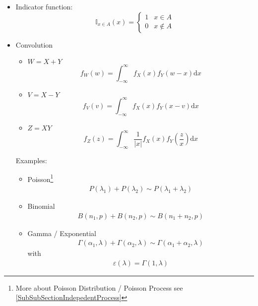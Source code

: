 \begin{itemize}
        
        \item Indicator function:
        \begin{equation}    
            \mathbb{I}_{x\in A}(x)=\begin{cases}
                1& x\in  A\\
                0& x\notin A
            \end{cases}
        \end{equation}
        \item Convolution
        \begin{itemize}
            \item $W=X+Y$
            \begin{equation}        
                f_W(w)=\int_{-\infty}^\infty f_X(x)f_Y(w-x)\mathrm{d}x    
            \end{equation}
            \item $V=X-Y$
            \begin{equation}        
                f_V(v)=\int_{-\infty}^\infty f_X(x)f_Y(x-v)\mathrm{d}x    
            \end{equation}
            \item $Z=XY$
            \begin{equation}        
                f_Z(z)=\int_{-\infty}^\infty \frac{1}{|x|}f_X(x)f_Y(\frac{z}{x})\mathrm{d}x
            \end{equation}
        \end{itemize}

            Examples:        
        \begin{itemize}[topsep=2pt,itemsep=0pt]
            \item Poisson\footnote{More about Poisson Distribution / Poisson Process see \autoref{SubSubSectionIndepedentProcess}}
            \begin{align}
                P(\lambda _1)+P(\lambda _2)\sim P(\lambda _1+\lambda _2) 
            \end{align}
            \item Binomial
            \begin{align}
                B(n_1,p)+B(n_2,p)\sim B(n_1+n_2,p) 
            \end{align}
            \item Gamma / Exponential
            \begin{align}
                \Gamma (\alpha _1,\lambda )+\Gamma (\alpha _2,\lambda )\sim \Gamma (\alpha _1+\alpha _2,\lambda ) 
            \end{align}
            with 
            \begin{align}
                \varepsilon (\lambda )=\Gamma (1,\lambda ) 
            \end{align}
            

\end{itemize}
\end{itemize}

